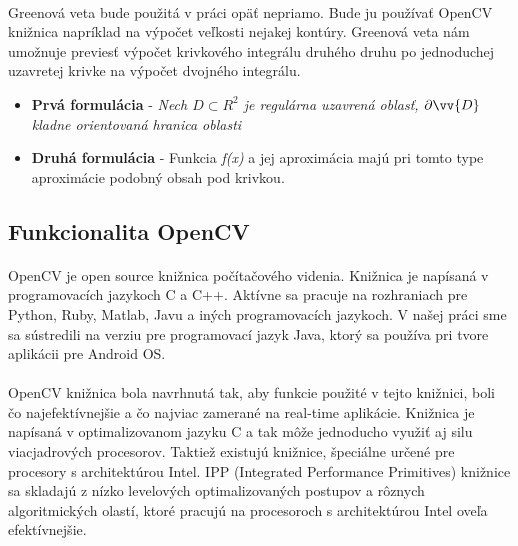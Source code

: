 \documentclass[12pt]{article}
\begin{document}
\paragraph{}
Greenová veta bude použitá v práci opäť nepriamo. Bude ju používať OpenCV knižnica napríklad na výpočet veľkosti nejakej kontúry. Greenová veta nám umožnuje previesť výpočet krivkového integrálu druhého druhu po jednoduchej uzavretej krivke na výpočet dvojného integrálu.
	\begin{itemize}
	  \item 
	  	\textbf{Prvá formulácia} - \emph{Nech \begin{math}D \subset R^2 \end{math} je regulárna uzavrená oblasť, \begin{math}\partial \vv{D} \end{math} kladne orientovaná hranica oblasti}
	  \item 
	  	\textbf{Druhá formulácia} - Funkcia \emph{f(x)} a jej aproximácia majú pri tomto type aproximácie podobný obsah pod krivkou.
	\end{itemize}
\cite{mat_an_2}
\subsection{Funkcionalita OpenCV}
\paragraph{}
OpenCV je open source knižnica počítačového videnia. Knižnica je napísaná v programovacích jazykoch C a C++. Aktívne sa pracuje na
rozhraniach pre Python, Ruby, Matlab, Javu a iných programovacích jazykoch. V našej práci sme sa sústredili na verziu pre programovací jazyk Java,
ktorý sa používa pri tvore aplikácii pre Android OS.
\cite{learning_opencv}
\paragraph{}
OpenCV knižnica bola navrhnutá tak, aby funkcie použité v tejto knižnici, boli čo najefektívnejšie a čo najviac zamerané na real-time aplikácie.
Knižnica je napísaná v optimalizovanom jazyku C a tak môže jednoducho využiť aj silu viacjadrových procesorov.
Taktiež existujú knižnice, špeciálne určené pre procesory s architektúrou Intel. IPP (Integrated Performance Primitives) knižnice  sa skladajú z nízko levelových 
optimalizovaných postupov a rôznych algoritmických olastí, ktoré pracujú na procesoroch s architektúrou Intel oveľa efektívnejšie.
\cite{learning_opencv}
\end{document}
